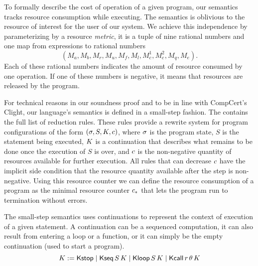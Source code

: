 \documentclass[nocopyrightspace,preprint]{sigplanconf}
\newcommand{\pref}[1]{\prettyref{#1}}
\begin{document}
To formally describe the cost of operation of a given
program, our semantics tracks resource consumption while
executing.  The semantics is oblivious to the resource of
interest for the user of our system.  We achieve this
independence by parameterizing by a resource
\emph{metric}, it is a tuple of nine rational numbers and
one map from expressions to rational numbers
$$
(
M_a,
M_b,
M_r,
M_u,
M_f,
M_l,
M_c^1,
M_c^2,
M_q,
M_e
).
$$
Each of these rational numbers indicates the amount of resource
consumed by one operation.  If one of these numbers is negative,
it means that resources are released by the program.

For technical reasons in our soundness proof and to be in line
with CompCert's Clight, our language's semantics is defined
in a small-step fashion.  The \pref{fig:opsem} contains the full
list of reduction rules.  These rules provide a rewrite
system for program configurations of the form
$(\sigma, S, K, c)$, where $\sigma$ is the program state,
$S$ is the statement being executed, $K$ is a continuation
that describes what remains to be done once the execution of $S$
is over, and $c$ is the non-negative quantity of resources
available for further execution.  All rules that can decrease
$c$ have the implicit side condition that the resource
quantity available after the step is non-negative.  Using this
resource counter we can define the resource consumption of a
program as the minimal resource counter $c_*$ that lets the
program run to termination without errors.

The small-step semantics uses continuations to represent the
context of execution of a given statement.
A continuation can be a sequenced computation, it can also result
from entering a loop or a function, or it can simply be the
empty continuation (used to start a program).
$$
K := \mathsf{Kstop}
\mid \mathsf{Kseq}\, S \, K
\mid \mathsf{Kloop}\, S \, K
\mid \mathsf{Kcall}\, r \, \theta \, K
$$
\end{document}
